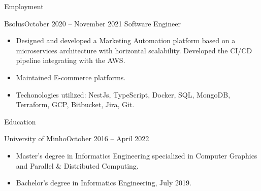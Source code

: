 \documentclass[]{mcdowellcv}
\begin{document}
	\makeheader

	\begin{cvsection}{Employment}
		\begin{cvsubsection}{Bsolus}{}{October 2020 -- November 2021}
			Software Engineer
			\begin{itemize}
                \item Designed and developed a Marketing Automation platform based on a microservices architecture with horizontal scalability. Developed the CI/CD pipeline integrating with the AWS.
                \item Maintained E-commerce platforms.
                \item Techonologies utilized: NestJs, TypeScript, Docker, SQL, MongoDB, Terraform, GCP, Bitbucket, Jira, Git.
			\end{itemize}
		\end{cvsubsection}
	\end{cvsection}

	\begin{cvsection}{Education}
		\begin{cvsubsection}{University of Minho}{}{October 2016 -- April 2022}
			\begin{itemize}
                \item Master’s degree in Informatics Engineering specialized in Computer Graphics and Parallel \& Distributed Computing.
                \item Bachelor's degree in Informatics Engineering, July 2019.
			\end{itemize}
		\end{cvsubsection}
	\end{cvsection}
\end{document}
